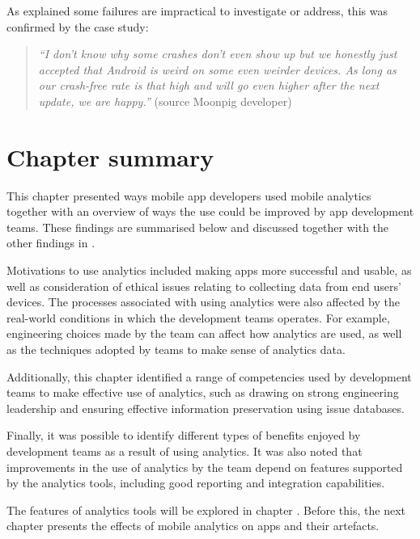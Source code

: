 As  explained some failures are impractical to investigate or address, this was confirmed by the  case study:

\begin{quote}
    \emph{``I don't know why some crashes don't even show up but we honestly just accepted that Android is weird on some even weirder devices. As long as our crash-free rate is that high and will go even higher after the next update, we are happy.''} (source Moonpig developer)
\end{quote}


\section{Chapter summary}
This chapter presented ways mobile app developers used mobile analytics together with an overview of ways the use could be improved by app development teams. These findings are summarised below and discussed together with the other findings in .

Motivations to use analytics included making apps more successful and usable, as well as consideration of ethical issues relating to collecting data from end users' devices. The processes associated with using analytics were also affected by the real-world conditions in which the development teams operates. For example, engineering choices made by the team can affect how analytics are used, as well as the techniques adopted by teams to make sense of analytics data. 

Additionally, this chapter identified a range of competencies used by development teams to make effective use of analytics, such as drawing on strong engineering leadership and ensuring effective information preservation using issue databases. 

Finally, it was possible to identify different types of benefits enjoyed by development teams as a result of using analytics. It was also noted that improvements in the use of analytics by the team depend on features supported by the analytics tools, including good reporting and integration capabilities. 

The features of analytics tools will be explored in chapter . Before this, the next chapter presents the effects of mobile analytics on apps and their artefacts.

